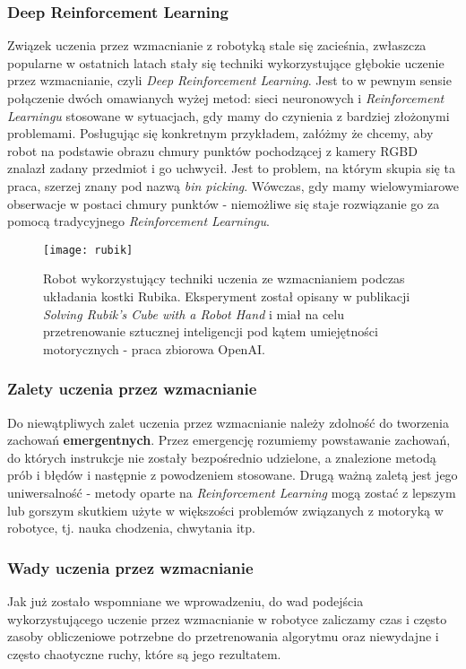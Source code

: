 \documentclass{article}
\begin{document}
\subsubsection*{\Large{Deep Reinforcement Learning}}
Związek uczenia przez wzmacnianie z robotyką stale się zacieśnia, zwłaszcza popularne w ostatnich latach stały się techniki wykorzystujące głębokie uczenie przez wzmacnianie, czyli \emph{Deep Reinforcement Learning}. Jest to w pewnym sensie połączenie dwóch omawianych wyżej metod: sieci neuronowych i \emph{Reinforcement Learningu} stosowane w sytuacjach, gdy mamy do czynienia z bardziej złożonymi problemami. Posługując się konkretnym przykładem, załóżmy że chcemy, aby robot na podstawie obrazu chmury punktów pochodzącej z kamery RGBD znalazł zadany przedmiot i go uchwycił. Jest to problem, na którym skupia się ta praca, szerzej znany pod nazwą \emph{bin picking}. Wówczas, gdy mamy wielowymiarowe obserwacje w postaci chmury punktów - niemożliwe się staje rozwiązanie go za pomocą tradycyjnego \emph{Reinforcement Learningu}. 

\begin{figure}[h]
\centering
\texttt{[image: rubik]}
\caption{Robot wykorzystujący techniki uczenia ze wzmacnianiem podczas układania kostki Rubika. Eksperyment został opisany w publikacji \emph{Solving Rubik's Cube with a Robot Hand} i miał na celu przetrenowanie sztucznej inteligencji pod kątem umiejętności motorycznych - praca zbiorowa OpenAI.}
\end{figure}

\subsubsection*{\Large{Zalety uczenia przez wzmacnianie}}
Do niewątpliwych zalet uczenia przez wzmacnianie należy zdolność do tworzenia zachowań \textbf{emergentnych}. Przez emergencję rozumiemy powstawanie zachowań, do których instrukcje nie zostały bezpośrednio udzielone, a znalezione metodą prób i błędów i następnie z powodzeniem stosowane. Drugą ważną zaletą jest jego uniwersalność - metody oparte na \emph{Reinforcement Learning} mogą zostać z lepszym lub gorszym skutkiem użyte w większości problemów związanych z motoryką w robotyce, tj. nauka chodzenia, chwytania itp.

\subsubsection*{\Large{Wady uczenia przez wzmacnianie}}
Jak już zostało wspomniane we wprowadzeniu, do wad podejścia wykorzystującego uczenie przez wzmacnianie w robotyce zaliczamy czas i często zasoby obliczeniowe potrzebne do przetrenowania algorytmu oraz niewydajne i często chaotyczne ruchy, które są jego rezultatem.
\end{document}
